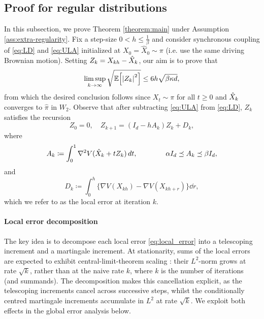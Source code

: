 \documentclass[11pt,a4paper]{article}
\begin{document}
    \subsection{Proof for regular distributions}\label{sec:extra-regularity}
    In this subsection, we prove Theorem \ref{theorem:main} under Assumption \ref{ass:extra-regularity}.
    Fix a step-size $0<h\le \frac1\beta$ and consider synchronous coupling of \eqref{eq:LD} and \eqref{eq:ULA} initialized at $X_0 = \hat X_0 \sim \pi$ (i.e. use the same driving Brownian motion).
    Setting $Z_k = X_{kh}-\hat{X}_k $, our aim is to prove that
    \begin{equation} \label{eq:desired-bound}
       \limsup_{k\to \infty} \sqrt{\expe{\abs*{Z_k}^2}} \le 6  h \sqrt{\beta \kappa d},
    \end{equation}
    from which the desired conclusion follows since $X_{t}\sim \pi$ for all $t\ge 0$ and $\hat{X}_k$ converges to $\hat \pi$ in $W_2$.
    Observe that after subtracting \eqref{eq:ULA} from \eqref{eq:LD}, $Z_k$ satisfies the recursion 
    \begin{equation}\label{eq:Zk}
        Z_0 = 0, \quad Z_{k+1} = (I_d-hA_k) Z_k + D_k, 
    \end{equation}
    where 
    \begin{equation}
        A_k \coloneqq \int_0^1 \nabla^2 V(\hat{X}_k+t Z_k) \, d t, \qquad  \qquad  \alpha I_d \preceq A_k \preceq \beta I_d,
    \end{equation}
    and 
    \begin{equation}     \label{eq:local_error}
        D_k\coloneq \int_0^h\{\nabla V(X_{kh})-\nabla V(X_{kh+r})\} \dd r,
    \end{equation}
    which we refer to as the local error at iteration $k$.
    \paragraph{Local error decomposition}
    The key idea is to decompose each local error \eqref{eq:local_error} into a telescoping increment and a martingale increment. At stationarity, sums of the local errors are expected to exhibit central-limit-theorem scaling \cite{gordin1969central,kipnis1986central,meyn2012markov}: their $L^2$-norm grows at rate $\sqrt{k}$, rather than at the naive rate $k$, where $k$ is the number of iterations (and summands). The decomposition makes this cancellation explicit, as the telescoping increments cancel across successive steps, whilst the conditionally centred martingale increments accumulate in $L^2$ at rate $\sqrt{k}$. We exploit both effects in the global error analysis below.
    
\end{document}
